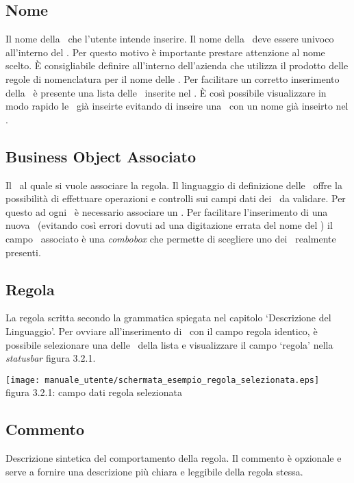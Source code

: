 \subsection{Nome}
Il nome della \br\ che l'utente intende inserire. Il nome della \br\ deve essere univoco all'interno del \rp. Per questo motivo \`e importante prestare attenzione al nome scelto. \`E consigliabile definire all'interno dell'azienda che utilizza il prodotto delle regole di nomenclatura per il nome delle \br. Per facilitare un corretto inserimento della \br\ \`e presente una lista delle \br\ inserite nel \rp. \`E cos\`i possibile visualizzare in modo rapido le \br\ gi\`a inseirte evitando di inseire una \br\ con un nome gi\`a inseirto nel \rp.

\subsection{Business Object Associato}
Il \bo\ al quale si vuole associare la regola. Il linguaggio di definizione delle \br\ offre la possibilit\`a di effettuare operazioni e controlli sui campi dati dei \bo\ da validare. Per questo ad ogni \br\ \`e necessario associare un \bo. Per facilitare l'inserimento di una nuova \br\ (evitando cos\`i errori dovuti ad una digitazione errata del nome del \bo) il campo \bo\ associato \`e una \textit{combobox} che permette di scegliere uno dei \bo\ realmente presenti.

\subsection{Regola}
La regola scritta secondo la grammatica spiegata nel capitolo `Descrizione del Linguaggio'. Per ovviare all'inserimento di \br\ con il campo regola identico, \`e possibile selezionare una delle \br\ della lista e visualizzare il campo `regola' nella \textit{statusbar} figura 3.2.1.

\begin{center}
\texttt{[image: manuale\_utente/schermata\_esempio\_regola\_selezionata.eps]}\\
 figura 3.2.1: campo dati regola selezionata
\end{center} 

\subsection{Commento}
Descrizione sintetica del comportamento della regola. Il commento \`e opzionale e serve a fornire una descrizione pi\`u chiara e leggibile della regola stessa.

